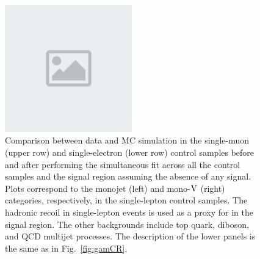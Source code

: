\begin{figure}[hbtp]
\begin{center}
\includegraphics[width=0.49\textwidth]{placeholder.png}
\caption{
Comparison between data and MC simulation in the single-muon (upper row) and single-electron (lower row)
control samples before and
after performing the simultaneous fit across all the control samples and the signal region
assuming the absence of any signal. Plots correspond to the monojet (left) and mono-$\mathrm{V}$ (right) categories,
respectively, in the single-lepton control samples.
The hadronic recoil \pt in single-lepton events is used as a proxy for \ptmiss in the signal region.
The other backgrounds include top quark, diboson, and QCD multijet processes.
The description of the lower panels is the same as in Fig.~\ref{fig:gamCR}.
}
\label{fig:wmnCR}\end{center}\end{figure}
